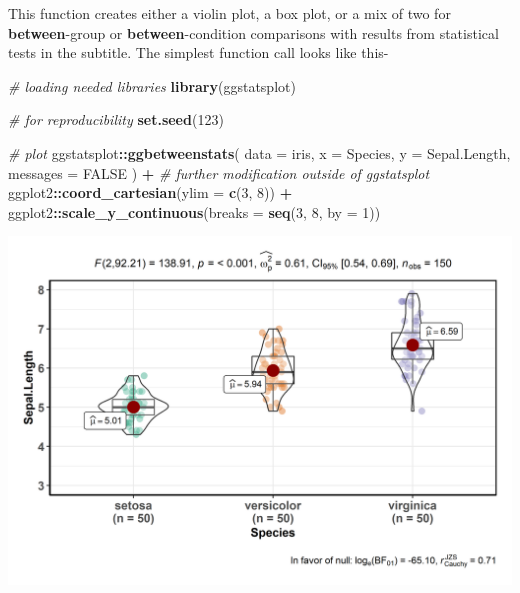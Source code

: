 \documentclass[
]{article}
\newenvironment{Shaded}{\begin{snugshade}}{\end{snugshade}}
\newcommand{\CommentTok}[1]{\textcolor[rgb]{0.56,0.35,0.01}{\textit{#1}}}
\newcommand{\DataTypeTok}[1]{\textcolor[rgb]{0.13,0.29,0.53}{#1}}
\newcommand{\DecValTok}[1]{\textcolor[rgb]{0.00,0.00,0.81}{#1}}
\newcommand{\KeywordTok}[1]{\textcolor[rgb]{0.13,0.29,0.53}{\textbf{#1}}}
\newcommand{\NormalTok}[1]{#1}
\newcommand{\OperatorTok}[1]{\textcolor[rgb]{0.81,0.36,0.00}{\textbf{#1}}}
\newcommand{\OtherTok}[1]{\textcolor[rgb]{0.56,0.35,0.01}{#1}}
\newcommand{\StringTok}[1]{\textcolor[rgb]{0.31,0.60,0.02}{#1}}
\begin{document}
This function creates either a violin plot, a box plot, or a mix of two for
\textbf{between}-group or \textbf{between}-condition comparisons with results from
statistical tests in the subtitle. The simplest function call looks like this-

\begin{Shaded}
\begin{Highlighting}[]
\CommentTok{\# loading needed libraries}
\KeywordTok{library}\NormalTok{(ggstatsplot)}

\CommentTok{\# for reproducibility}
\KeywordTok{set.seed}\NormalTok{(}\DecValTok{123}\NormalTok{)}

\CommentTok{\# plot}
\NormalTok{ggstatsplot}\OperatorTok{::}\KeywordTok{ggbetweenstats}\NormalTok{(}
  \DataTypeTok{data =}\NormalTok{ iris,}
  \DataTypeTok{x =}\NormalTok{ Species,}
  \DataTypeTok{y =}\NormalTok{ Sepal.Length,}
  \DataTypeTok{messages =} \OtherTok{FALSE}
\NormalTok{) }\OperatorTok{+}\StringTok{ }\CommentTok{\# further modification outside of ggstatsplot}
\StringTok{  }\NormalTok{ggplot2}\OperatorTok{::}\KeywordTok{coord\_cartesian}\NormalTok{(}\DataTypeTok{ylim =} \KeywordTok{c}\NormalTok{(}\DecValTok{3}\NormalTok{, }\DecValTok{8}\NormalTok{)) }\OperatorTok{+}
\StringTok{  }\NormalTok{ggplot2}\OperatorTok{::}\KeywordTok{scale\_y\_continuous}\NormalTok{(}\DataTypeTok{breaks =} \KeywordTok{seq}\NormalTok{(}\DecValTok{3}\NormalTok{, }\DecValTok{8}\NormalTok{, }\DataTypeTok{by =} \DecValTok{1}\NormalTok{))}
\end{Highlighting}
\end{Shaded}

\includegraphics[width=1\linewidth]{./figures/paper-ggbetweenstats1-1}
\end{document}
